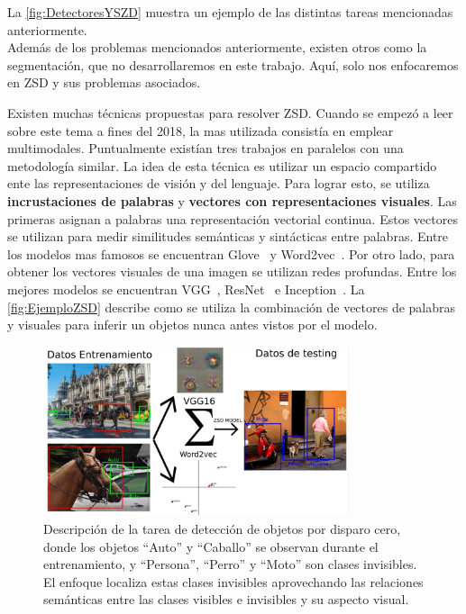 La \autoref{fig:DetectoresYSZD} muestra un ejemplo de las distintas tareas  mencionadas anteriormente.\\

Además de los problemas mencionados anteriormente, existen otros como la segmentación, que no desarrollaremos en este trabajo. Aquí, solo nos enfocaremos en ZSD y sus problemas asociados.
 
Existen muchas técnicas propuestas para resolver ZSD. Cuando se empezó a leer sobre este tema a fines del 2018, la mas utilizada consistía en emplear multimodales. Puntualmente existían tres trabajos en paralelos \cite{rahman2018zero}\cite{zhu2018zero}\cite{bansal2018zero} con una metodología similar. La idea de esta técnica es utilizar un espacio compartido ente las representaciones de visión y del lenguaje. Para lograr esto, se utiliza  \textbf{incrustaciones de palabras} y \textbf{vectores con representaciones visuales}. Las primeras asignan a palabras una representación vectorial continua. Estos vectores se utilizan para medir similitudes semánticas y sintácticas entre palabras. Entre los modelos mas famosos se encuentran Glove~\cite{pennington-etal-2014-glove} y Word2vec~\cite{mikolov2013efficient}. Por otro lado, para obtener los vectores visuales de una imagen se utilizan redes profundas. Entre los mejores modelos se encuentran VGG~\cite{simonyan2014very}, ResNet~\cite{resnet} e Inception~\cite{Szegedy_2015_CVPR}. La \autoref{fig:EjemploZSD} describe como se utiliza la combinación de vectores de palabras y visuales para inferir un objetos nunca antes vistos por el modelo.\\

\begin{figure}[]
	\centering
	\includegraphics[width=0.8\textwidth]{img/Modelo.jpg}
	\caption{Descripción de la tarea de detección de objetos por disparo cero, donde los objetos ``Auto'' y ``Caballo'' se observan  durante el entrenamiento, y ``Persona'', ``Perro'' y ``Moto'' son clases invisibles. El enfoque localiza estas clases invisibles aprovechando las relaciones semánticas entre las clases visibles e invisibles y su aspecto visual.}
	\label{fig:EjemploZSD}
\end{figure}

